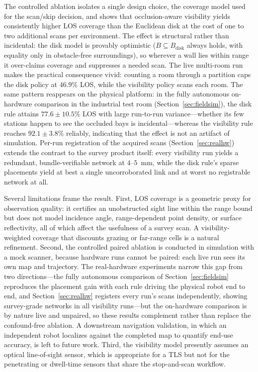 \documentclass[sensors,article,submit,pdftex,moreauthors]{Definitions/mdpi}
\begin{document}
The controlled ablation isolates a single design choice, the coverage model used
for the scan/skip decision, and shows that occlusion-aware visibility yields
consistently higher LOS coverage than the Euclidean disk at the cost of one to
two additional scans per environment. The effect is structural rather than incidental:
the disk model is provably optimistic ($B\subseteq B_{\mathrm{disk}}$ always
holds, with equality only in obstacle-free surroundings), so wherever a wall lies within
range it over-claims coverage and suppresses a needed scan. The live multi-room
run makes the practical consequence vivid: counting a room through a partition
caps the disk policy at $46.9\%$ LOS, while the visibility policy scans each room.
The same pattern reappears on the physical platform: in the fully autonomous
on-hardware comparison in the industrial test room (Section~\ref{sec:fieldsim}),
the disk rule attains $77.6\pm10.5\%$ LOS with large run-to-run variance---whether
its few stations happen to see the occluded bays is incidental---whereas the
visibility rule reaches $92.1\pm3.8\%$ reliably, indicating that the effect is
not an artifact of simulation. Per-run registration of the acquired scans
(Section~\ref{sec:realhw}) extends the contrast to the survey product itself:
every visibility run yields a redundant, bundle-verifiable network at
$4$--$5$~mm, while the disk rule's sparse placements yield at best a single
uncorroborated link and at worst no registrable network at all.

Several limitations frame the result. First, LOS coverage is a geometric proxy
for observation quality: it certifies an unobstructed sight line within the range
bound but does not model incidence angle, range-dependent point density, or
surface reflectivity, all of which affect the usefulness of a survey scan. A
visibility-weighted coverage that discounts grazing or far-range cells is a
natural refinement. Second, the controlled paired ablation is conducted in
simulation with a mock scanner, because hardware runs cannot be paired: each
live run sees its own map and trajectory. The real-hardware experiments narrow
this gap from two directions---the fully autonomous comparison of
Section~\ref{sec:fieldsim} reproduces the placement gain with each rule driving
the physical robot end to end, and Section~\ref{sec:realhw} registers every
run's scans independently, showing survey-grade networks in all visibility
runs---but the on-hardware comparison is by nature live and unpaired, so these
results complement rather than replace the confound-free ablation. A downstream
navigation validation, in which an independent robot localizes against the
completed map to quantify end-use accuracy, is left to future work.
Third, the visibility model presently assumes an optical line-of-sight sensor,
which is
appropriate for a TLS but not for the penetrating or dwell-time sensors that
share the stop-and-scan workflow.
\end{document}

